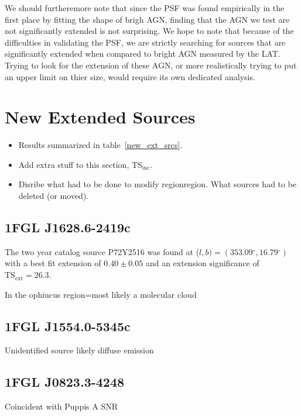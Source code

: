 \documentclass[preprint]{aastex}
\newcommand{\tsext}{\ensuremath{\text{TS}_\text{ext}}\xspace}
\newcommand{\tsinc}{\ensuremath{\text{TS}_\text{inc}}\xspace}
\renewcommand{\deg}{\ensuremath{^\circ}\xspace}
\begin{document}
We should furtheremore note that since the PSF was found empirically in
the first place by fitting the shape of brigh AGN, finding that the AGN we
test are not significantly extended is not surprising.  We hope to note
that because of the difficulties in validating the PSF, we are strictly
searching for sources that are significantly extended when compared to
bright AGN measured by the LAT. Trying to look for the extension of these
AGN, or more realistically trying to put an upper limit on thier size,
would require its own dedicated analysis.



\section{New Extended Sources}

\begin{itemize}
  \item Results summarized in table~\ref{new_ext_srcs}.
  \item Add extra stuff to this section, $\tsinc$.
  \item Disribe what had to be done to modify regionregion.
    What sources had to be deleted (or moved).

\end{itemize}

\subsection{1FGL J1628.6-2419c}

The two year catalog source P72Y2516 was found at ($l,b)=(353.09\deg, 16.79\deg)$
with a best fit extension of $0.40\pm0.05$ and an extension significance of
$\tsext=26.3$.

In the ophiucus region=most likely a molecular cloud

\subsection{1FGL J1554.0-5345c}
Unidentified source likely diffuse emission

\subsection{1FGL J0823.3-4248}
Coincident with Puppis A SNR
\end{document}
